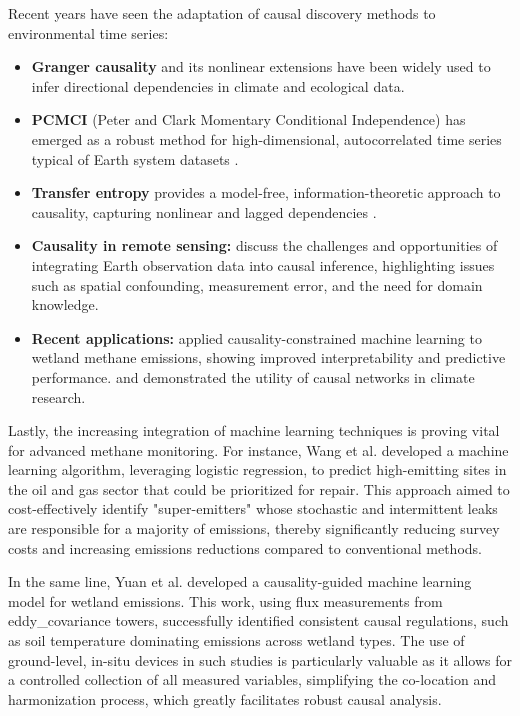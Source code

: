 Recent years have seen the adaptation of causal discovery methods to environmental time series:
\begin{itemize}
	\item \textbf{Granger causality} \cite{Granger} and its nonlinear extensions have been widely used to infer directional dependencies in climate and ecological data.
	\item \textbf{PCMCI} (Peter and Clark Momentary Conditional Independence) has emerged as a robust method for high-dimensional, autocorrelated time series typical of Earth system datasets \cite{Runge2019}.
	\item \textbf{Transfer entropy} provides a model-free, information-theoretic approach to causality, capturing nonlinear and lagged dependencies \cite{Schreiber2000}.
	\item \textbf{Causality in remote sensing:} \cite{jerzak2023} discuss the challenges and opportunities of integrating Earth observation data into causal inference, highlighting issues such as spatial confounding, measurement error, and the need for domain knowledge.
	\item \textbf{Recent applications:} \cite{Yuan2022} applied causality-constrained machine learning to wetland methane emissions, showing improved interpretability and predictive performance. \cite{Kretschmer2016} and \cite{EbertUphoff2021} demonstrated the utility of causal networks in climate research.
\end{itemize}

Lastly, the increasing integration of machine learning techniques is proving vital for advanced methane monitoring. For instance, Wang et al. \cite{wang2020} developed a machine learning algorithm, leveraging logistic regression, to predict high-emitting sites in the oil and gas sector that could be prioritized for repair. This approach aimed to cost-effectively identify "super-emitters" whose stochastic and intermittent leaks are responsible for a majority of emissions, thereby significantly reducing survey costs and increasing emissions reductions compared to conventional methods.

In the same line, Yuan et al. \cite{Yuan2022} developed a causality-guided machine learning model for wetland  emissions. This work, using flux measurements from \gls{eddy_covariance} towers, successfully identified consistent causal regulations, such as soil temperature dominating  emissions across wetland types. The use of ground-level, in-situ devices in such studies is particularly valuable as it allows for a controlled collection of all measured variables, simplifying the co-location and harmonization process, which greatly facilitates robust causal analysis.

